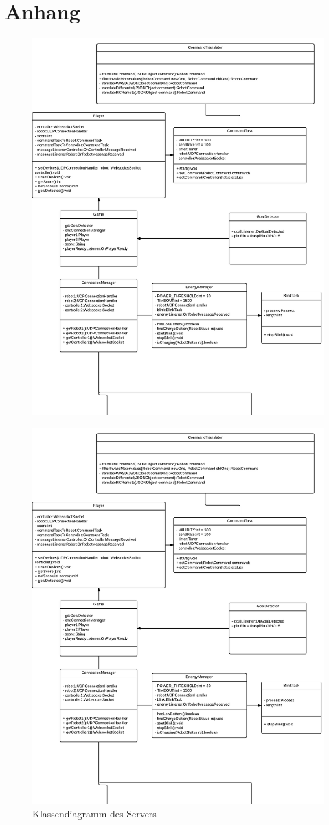 \chapter{Anhang}
\label{ch:anhang}

\begin{figure}[h]
	\includegraphics[page=1,width=.7\textwidth]{images/uml_software_all.pdf}

\end{figure}
\begin{figure}[h]
	\includegraphics[page=2,width=.7\textwidth]{images/uml_software_all.pdf}
	
	\caption{Klassendiagramm des Servers}
	\label{fig:server_uml_all}
\end{figure}